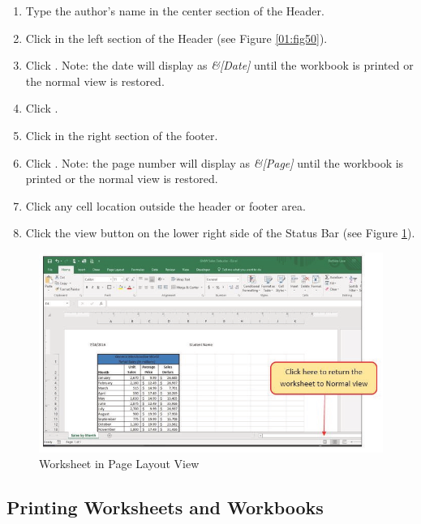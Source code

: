 \begin{enumbox}
	\begin{enumerate}
		\item Type the author's name in the center section of the Header.
		\item Click in the left section of the Header (see Figure \ref{01:fig50}).
		\item Click . Note: the date will display as \textit{\&[Date]} until the workbook is printed or the normal view is restored.
		\item Click .
		\item Click in the right section of the footer.
		\item Click . Note: the page number will display as \textit{\&[Page]} until the workbook is printed or the normal view is restored.
		\item Click any cell location outside the header or footer area.
		\item Click the  view button on the lower right side of the Status Bar (see Figure \ref{01:fig51}).
	\end{enumerate}
\end{enumbox}

\begin{figure}[H]
	\centering
	\includegraphics[width=\maxwidth{.95\linewidth}]{gfx/ch01_fig51}
	\caption{Worksheet in Page Layout View}
	\label{01:fig51}
\end{figure}

\subsection{Printing Worksheets and Workbooks}

